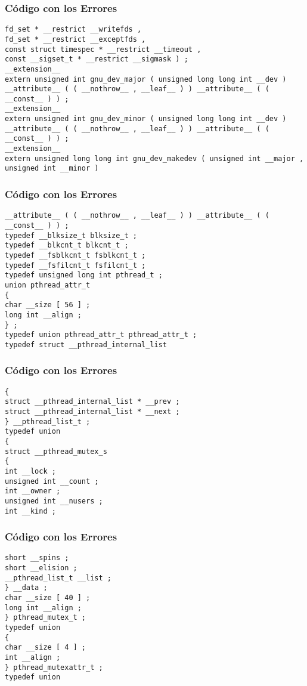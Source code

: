 \documentclass{beamer}
\begin{document}
\begin{frame}[fragile]
\frametitle{C\'odigo con los Errores}
\begin{lstlisting}[style=CStyle]
fd_set * __restrict __writefds , 
fd_set * __restrict __exceptfds , 
const struct timespec * __restrict __timeout , 
const __sigset_t * __restrict __sigmask ) ; 
__extension__ 
extern unsigned int gnu_dev_major ( unsigned long long int __dev ) 
__attribute__ ( ( __nothrow__ , __leaf__ ) ) __attribute__ ( ( __const__ ) ) ; 
__extension__ 
extern unsigned int gnu_dev_minor ( unsigned long long int __dev ) 
__attribute__ ( ( __nothrow__ , __leaf__ ) ) __attribute__ ( ( __const__ ) ) ; 
__extension__ 
extern unsigned long long int gnu_dev_makedev ( unsigned int __major , 
unsigned int __minor ) 
\end{lstlisting}
\end{frame}
\begin{frame}[fragile]
\frametitle{C\'odigo con los Errores}
\begin{lstlisting}[style=CStyle]
__attribute__ ( ( __nothrow__ , __leaf__ ) ) __attribute__ ( ( __const__ ) ) ; 
typedef __blksize_t blksize_t ; 
typedef __blkcnt_t blkcnt_t ; 
typedef __fsblkcnt_t fsblkcnt_t ; 
typedef __fsfilcnt_t fsfilcnt_t ; 
typedef unsigned long int pthread_t ; 
union pthread_attr_t 
{ 
char __size [ 56 ] ; 
long int __align ; 
} ; 
typedef union pthread_attr_t pthread_attr_t ; 
typedef struct __pthread_internal_list 
\end{lstlisting}
\end{frame}
\begin{frame}[fragile]
\frametitle{C\'odigo con los Errores}
\begin{lstlisting}[style=CStyle]
{ 
struct __pthread_internal_list * __prev ; 
struct __pthread_internal_list * __next ; 
} __pthread_list_t ; 
typedef union 
{ 
struct __pthread_mutex_s 
{ 
int __lock ; 
unsigned int __count ; 
int __owner ; 
unsigned int __nusers ; 
int __kind ; 
\end{lstlisting}
\end{frame}
\begin{frame}[fragile]
\frametitle{C\'odigo con los Errores}
\begin{lstlisting}[style=CStyle]
short __spins ; 
short __elision ; 
__pthread_list_t __list ; 
} __data ; 
char __size [ 40 ] ; 
long int __align ; 
} pthread_mutex_t ; 
typedef union 
{ 
char __size [ 4 ] ; 
int __align ; 
} pthread_mutexattr_t ; 
typedef union 
\end{lstlisting}
\end{frame}
\end{document}

